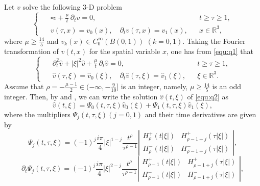 \documentclass[11pt,twoside]{article}
\newcommand{\R}{\mathbb R}
\newcommand{\p}{\partial}
\newcommand{\f}{\frac}
\theoremstyle{plain}
\theoremstyle{definition}
\theoremstyle{remark}
\numberwithin{equation}{section}
\begin{document}
Let $v$ solve the following 3-D problem
\begin{equation}\label{equ:q1}
\left\{ \enspace
\begin{aligned}
&\square v+\f{\mu}{t}\,\p_tv=0, &&
t\geq \tau \geq1,\\
&v(\tau,x)=v_0(x), \quad \partial_{t} v(\tau,x)=v_1(x), &&x\in\R^3,
\end{aligned}
\right.
\end{equation}
where $\mu\geq \f{14}{5}$ and $v_k(x)\in C_0^{\infty}(B(0,1))$ $(k=0, 1)$.
Taking the Fourier transformation of $v(t,x)$ for the spatial variable $x$, one has from \eqref{equ:q1} that
\begin{equation}\label{equ:q2}
\left\{ \enspace
\begin{aligned}
&\partial_t^2 \hat{v} +|\xi|^{2} \hat{v} +\f{\mu}{t}\,\p_t\hat{v}=0, &&
t\geq \tau \geq 1,\\
&\hat{v}(\tau,\xi)=\hat{v}_0(\xi), \quad \partial_{t} \hat{v}(\tau,\xi)=\hat{v}_1(\xi), &&\xi\in\R^3.
\end{aligned}
\right.
\end{equation}
Assume that $\rho=-\f{\mu-1}{2}\in(-\infty, -\f{9}{10}]$ is  an integer, namely, $\mu\geq \f{14}{5}$ is  an odd integer. Then, by   \cite[Theorem 2.1]{Wirth-3} and \cite[Lemma 2.1]{LY}, we can write the solution $\hat{v}(t, \xi)$ of
\eqref{equ:q2} as
\begin{equation}\label{equ:q4}
\hat{v}(t, \xi)=\Psi_{0}(t, \tau, \xi) \hat{v}_{0}(\xi)+\Psi_{1}(t, \tau, \xi) \hat{v}_{1}(\xi),
\end{equation}
where the multipliers $\Psi_{j}(t, \tau, \xi)(j=0,1)$ and their time derivatives are given by
\begin{equation}\label{equ:q6}
\Psi_{j}(t, \tau, \xi)=(-1)^{j}\frac{i \pi}{4}|\xi|^{1-j}  \frac{t^{\rho}}{\tau^{\rho-1}}\left|\begin{array}{ll}
H_{\rho}^{+}(t|\xi|) & H_{\rho-1+j}^{+}(\tau|\xi|) \\
H_{\rho}^{-}(t|\xi|) & H_{\rho-1+j}^{-}(\tau|\xi|)
\end{array}\right|,
\end{equation}
\begin{equation}\label{equ:q9}
\partial_{t} \Psi_{j}(t, \tau, \xi)=(-1)^{j} \frac{i \pi}{4}|\xi|^{2-j} \frac{t^{\rho}}{\tau^{\rho-1}}\left|\begin{array}{ll}
H_{\rho-1}^{+}(t|\xi|) & H_{\rho-1+j}^{+}(\tau|\xi|)  \\
H_{\rho-1}^{-}(t|\xi|) & H_{\rho-1+j}^{-}(\tau|\xi|)
\end{array}\right|,
\end{equation}
\end{document}

